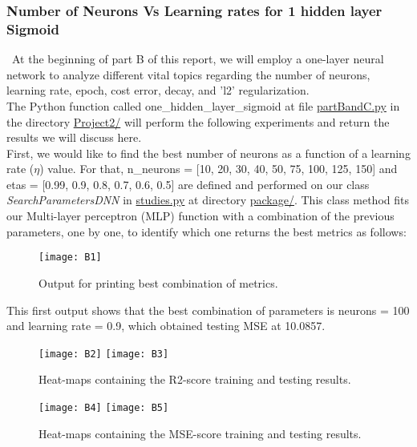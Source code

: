 \subsubsection{Number of Neurons Vs Learning rates for 1 hidden layer Sigmoid}
\label{chap:Number of Neurons Vs Learning rates for 1 hidden layer Sigmoid}

\qquad \, At the beginning of part B of this report, we will employ a one-layer neural network to analyze different vital topics regarding the number of neurons, learning rate, epoch, cost error, decay, and 'l2' regularization.\\

The Python function called one\_hidden\_layer\_sigmoid at file \href{https://github.com/fabiorodp/UiO-FYS-STK4155/blob/master/Project2/partBandC.py}{partBandC.py} in the directory \href{https://github.com/fabiorodp/UiO-FYS-STK4155/blob/master/Project2/}{Project2/} will perform the following experiments and return the results we will discuss here.\\

First, we would like to find the best number of neurons as a function of a learning rate ($\eta$) value. For that, n\_neurons = [10, 20, 30, 40, 50, 75, 100, 125, 150] and etas = [0.99, 0.9, 0.8, 0.7, 0.6, 0.5] are defined and performed on our class \textit{SearchParametersDNN} in \href{https://github.com/fabiorodp/UiO-FYS-STK4155/blob/master/Project2/package/studies.py}{studies.py} at directory \href{https://github.com/fabiorodp/UiO-FYS-STK4155/blob/master/Project2/package/}{package/}. This class method fits our Multi-layer perceptron (MLP) function with a combination of the previous parameters, one by one, to identify which one returns the best metrics as follows:

\begin{figure}[H]
\label{fig:B1}
\centering
\texttt{[image: B1]}
\caption{Output for printing best combination of metrics.}
\end{figure}

This first output shows that the best combination of parameters is neurons = 100 and learning rate = 0.9, which obtained testing MSE at 10.0857.

\begin{figure}[H]
\label{fig:B2}
\centering
\texttt{[image: B2]}
\texttt{[image: B3]}
\caption{Heat-maps containing the R2-score training and testing results.}
\end{figure}

\begin{figure}[H]
\label{fig:B3}
\centering
\texttt{[image: B4]}
\texttt{[image: B5]}
\caption{Heat-maps containing the MSE-score training and testing results.}
\end{figure}

